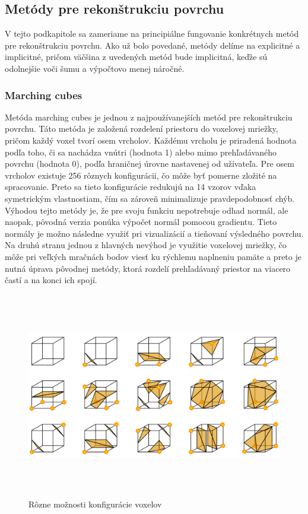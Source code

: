 \subsection{Metódy pre rekonštrukciu povrchu}
\noindent V tejto podkapitole sa zameriame na principiálne fungovanie konkrétnych metód pre rekonštrukciu povrchu. Ako už bolo povedané, metódy delíme na explicitné a implicitné, pričom väčšina z uvedených metód bude implicitná, keďže sú odolnejšie voči šumu a výpočtovo menej náročné. 
\subsubsection{Marching cubes} 
\noindent Metóda marching cubes je jednou z najpoužívanejších metód pre rekonštrukciu povrchu. Táto metóda je založená rozdelení priestoru do voxelovej mriežky, pričom každý voxel tvorí osem vrcholov. Každému vrcholu je priradená hodnota podľa toho, či sa nachádza vnútri (hodnota 1) alebo mimo prehľadávaného povrchu (hodnota 0), podľa hraničnej úrovne nastavenej od užívateľa. Pre osem vrcholov existuje 256 rôznych konfigurácii, čo môže byť pomerne zložité na spracovanie. Preto sa tieto konfigurácie redukujú na 14 vzorov vďaka symetrickým vlastnostiam, čím sa zároveň minimalizuje pravdepodobnosť chýb. \cite{MarchingCubeas_origin}
\newline\indent Výhodou tejto metódy je, že pre svoju funkciu nepotrebuje odhad normál, ale naopak, pôvodná verzia ponúka výpočet normál pomocou gradientu. Tieto normály je možno následne využiť pri vizualizácií a tieňovaní výsledného povrchu. Na druhú stranu jednou z hlavných nevýhod je využitie voxelovej mriežky, čo môže pri veľkých mračnách bodov viesť ku rýchlemu naplneniu pamäte a preto je nutná úprava pôvodnej metódy, ktorá rozdelí prehľadávaný priestor na viacero častí a na konci ich spojí.
\begin{figure}[!htbp]
  \centering
  \includegraphics[width=16cm, height=9cm]{img/marching_cubes.png}
  \caption{Rôzne možnosti konfigurácie voxelov \cite{MarchCubes_img}} 
  \label{marchingCubes}
\end{figure} 
